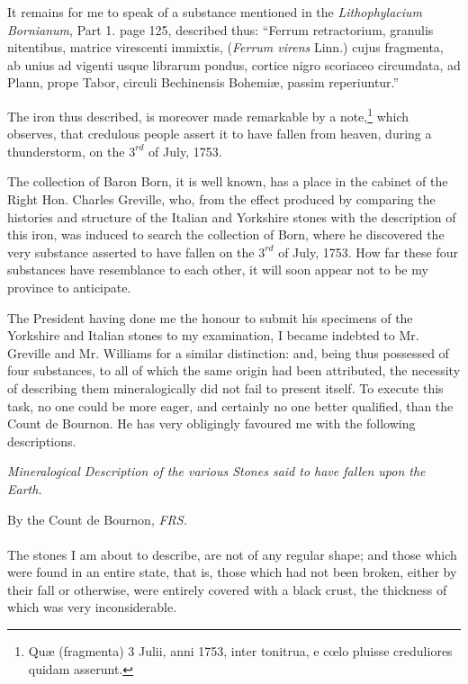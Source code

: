 \documentclass[a4paper, 12pt, oneside]{article}
\begin{document}
It remains for me to speak of a substance mentioned in the \emph{Lithophylacium Bornianum}, Part 1. page 125, described thus: ``Ferrum retractorium, granulis nitentibus, matrice virescenti immixtis, (\emph{Ferrum virens} Linn.) cujus fragmenta, ab unius ad vigenti usque librarum pondus, cortice nigro scoriaceo circumdata, ad Plann, prope Tabor, circuli Bechinensis Bohemiæ, passim reperiuntur.''

The iron thus described, is moreover made remarkable by a note,\footnote{Quæ (fragmenta) 3 Julii, anni 1753, inter tonitrua, e cœlo pluisse creduliores quidam asserunt.} which observes, that credulous people assert it to have fallen from heaven, during a thunderstorm, on the $3^{rd}$ of July, 1753.

The collection of Baron Born, it is well known, has a place in the cabinet of the Right Hon. Charles Greville, who, from the effect produced by comparing the histories and structure of the Italian and Yorkshire stones with the description of this iron, was induced to search the collection of Born, where he discovered the very substance asserted to have fallen on the $3^{rd}$ of July, 1753. How far these four substances have resemblance to each other, it will soon appear not to be my province to anticipate.

The President having done me the honour to submit his specimens of the Yorkshire and Italian stones to my examination, I became indebted to Mr. Greville and Mr. Williams for a similar distinction: and, being thus possessed of four substances, to all of which the same origin had been attributed, the necessity of describing them mineralogically did not fail to present itself. To execute this task, no one could be more eager, and certainly no one better qualified, than the Count de Bournon. He has very obligingly favoured me with the following descriptions.
\begin{center}
\emph{Mineralogical Description of the various Stones said to have fallen upon the Earth.}
\end{center}
\begin{center}
By the Count de Bournon, \emph{FRS.}
\end{center}
\paragraph{}
The stones I am about to describe, are not of any regular shape; and those which were found in an entire state, that is, those which had not been broken, either by their fall or otherwise, were entirely covered with a black crust, the thickness of which was very inconsiderable.
\end{document}
